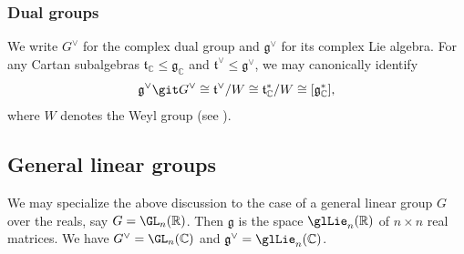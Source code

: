 \subsubsection{Dual groups}
We write $G^\vee$ for the complex dual group and $\mathfrak{g}^\vee$ for its complex Lie algebra.  For any Cartan subalgebras $\mathfrak{t}_\mathbb{C} \leq \mathfrak{g}_\mathbb{C}$ and $\mathfrak{t}^\vee \leq \mathfrak{g}^\vee$, we may canonically identify
\begin{equation}\label{eqn:inf-chars-via-langlands-params}
  \mathfrak{g}^\vee \git G^\vee
  \cong \mathfrak{t}^\vee / W
  \cong \mathfrak{t}_\mathbb{C}^*/W \cong [\mathfrak{g}_\mathbb{C}^*],
\end{equation}
where $W$ denotes the Weyl group (see \cite[\S15.1]{nelson-venkatesh-1}).

\subsection{General linear groups}\label{sec:gener-line-groups}
We may specialize the above discussion to the case of a general linear group $G$ over the reals, say $G = \GL_n(\mathbb{R})$.  Then $\mathfrak{g}$ is the space $\glLie_n(\mathbb{R})$ of $n \times n$ real matrices.  We have $G^\vee = \GL_n(\mathbb{C})$ and $\mathfrak{g}^\vee = \glLie_n(\mathbb{C})$.

